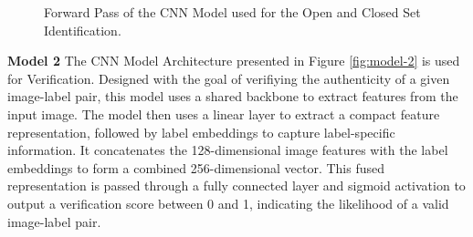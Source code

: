 \begin{figure}[ht!]
    \caption{Forward Pass of the CNN Model used for the Open and Closed Set Identification.}
    \label{fig:model-1}
\end{figure}

\textbf{Model 2} The CNN Model Architecture presented in Figure \ref{fig:model-2} is used for Verification. Designed with the goal of verifiying the authenticity of a given image-label pair, this model uses a shared backbone to extract features from the input image. The model then uses a linear layer to extract a compact feature representation, followed by label embeddings to capture label-specific information. It concatenates the 128-dimensional image features with the label embeddings to form a combined 256-dimensional vector. This fused representation is passed through a fully connected layer and sigmoid activation to output a verification score between 0 and 1, indicating the likelihood of a valid image-label pair.


